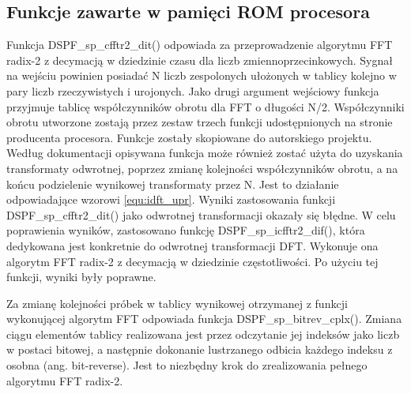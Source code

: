 \subsection{Funkcje zawarte w pamięci ROM procesora}
Funkcja DSPF\_sp\_cfftr2\_dit() odpowiada za przeprowadzenie algorytmu FFT radix-2 z decymacją w dziedzinie czasu dla liczb zmiennoprzecinkowych. Sygnał na wejściu powinien posiadać N liczb zespolonych ułożonych w tablicy kolejno w pary liczb rzeczywistych i urojonych. Jako drugi argument wejściowy funkcja przyjmuje tablicę współczynników obrotu dla FFT o długości N/2. Współczynniki obrotu utworzone zostają przez zestaw trzech funkcji udostępnionych na stronie producenta procesora. Funkcje zostały skopiowane do autorskiego projektu. %
Według dokumentacji opisywana funkcja może również zostać użyta do uzyskania transformaty odwrotnej, poprzez zmianę kolejności współczynników obrotu, a na końcu podzielenie wynikowej transformaty przez N. Jest to działanie odpowiadające wzorowi \ref{equ:idft_upr}. Wyniki zastosowania funkcji DSPF\_sp\_cfftr2\_dit() jako odwrotnej transformacji okazały się błędne. W celu poprawienia wyników, zastosowano funkcję DSPF\_sp\_icfftr2\_dif(), która dedykowana jest konkretnie do odwrotnej transformacji DFT. Wykonuje ona algorytm FFT radix-2 z decymacją w dziedzinie częstotliwości. Po użyciu tej funkcji, wyniki były poprawne.

Za zmianę kolejności próbek w tablicy wynikowej otrzymanej z funkcji wykonującej algorytm FFT odpowiada funkcja DSPF\_sp\_bitrev\_cplx(). Zmiana ciągu elementów tablicy realizowana jest przez odczytanie jej indeksów jako liczb w postaci bitowej, a następnie dokonanie lustrzanego odbicia każdego indeksu z osobna (ang. bit-reverse). Jest to niezbędny krok do zrealizowania pełnego algorytmu FFT radix-2.

